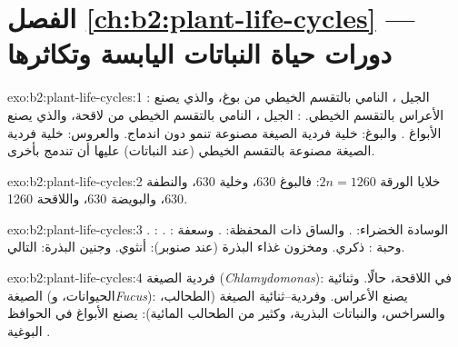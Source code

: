 \section*{الفصل \ref{ch:b2:plant-life-cycles} --- دورات حياة النباتات اليابسة وتكاثرها}

\begin{solution}{exo:b2:plant-life-cycles:1}
: الجيل  ، النامي بالتقسم
الخيطي من بوغ، والذي يصنع الأعراس بالتقسم الخيطي. :
الجيل ، النامي بالتقسم الخيطي من لاقحة، والذي يصنع
الأبواغ . والبوغ: خلية فردية الصيغة مصنوعة  تنمو دون اندماج. والعروس: خلية فردية الصيغة مصنوعة بالتقسم
الخيطي (عند النباتات) عليها أن تندمج بأخرى.
\end{solution}

\begin{solution}{exo:b2:plant-life-cycles:2}
خلايا الورقة $2n = 1260$: فالبوغ 630، وخلية  630، والنطفة
630، والبويضة 630، واللاقحة 1260.
\end{solution}

\begin{solution}{exo:b2:plant-life-cycles:3}
الوسادة الخضراء: . والساق ذات المحفظة: . وسعفة
: . : . وحبة :  ذكري.
ومخزون غذاء البذرة (عند صنوبر):  أنثوي.
وجنين البذرة:  التالي.
\end{solution}

\begin{solution}{exo:b2:plant-life-cycles:4}
فردية الصيغة (\emph{Chlamydomonas}):  في اللاقحة،
حالًا. وثنائية الصيغة (الحيوانات، و\emph{Fucus}): 
يصنع الأعراس. وفردية--ثنائية الصيغة (الطحالب، والسراخس، والنباتات
البذرية، وكثير من الطحالب المائية):  يصنع الأبواغ في
الحوافظ البوغية .
\end{solution}

